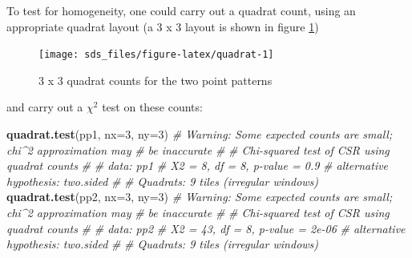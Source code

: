 \documentclass[]{book}
\newenvironment{Shaded}{\begin{snugshade}}{\end{snugshade}}
\newcommand{\CommentTok}[1]{\textcolor[rgb]{0.56,0.35,0.01}{\textit{#1}}}
\newcommand{\DataTypeTok}[1]{\textcolor[rgb]{0.13,0.29,0.53}{#1}}
\newcommand{\DecValTok}[1]{\textcolor[rgb]{0.00,0.00,0.81}{#1}}
\newcommand{\FloatTok}[1]{\textcolor[rgb]{0.00,0.00,0.81}{#1}}
\newcommand{\KeywordTok}[1]{\textcolor[rgb]{0.13,0.29,0.53}{\textbf{#1}}}
\newcommand{\NormalTok}[1]{#1}
\newcommand{\OperatorTok}[1]{\textcolor[rgb]{0.81,0.36,0.00}{\textbf{#1}}}
\newcommand{\StringTok}[1]{\textcolor[rgb]{0.31,0.60,0.02}{#1}}
\begin{document}
\begin{Shaded}
\end{Shaded}

To test for homogeneity, one could carry out a quadrat count, using
an appropriate quadrat layout (a 3 x 3 layout is shown in figure
\ref{fig:quadrat})

\begin{figure}

{\centering \texttt{[image: sds\_files/figure-latex/quadrat-1]} 

}

\caption{3 x 3 quadrat counts for the two point patterns}\label{fig:quadrat}
\end{figure}

and carry out a \(\chi^2\) test on these counts:

\begin{Shaded}
\begin{Highlighting}[]
\KeywordTok{quadrat.test}\NormalTok{(pp1, }\DataTypeTok{nx=}\DecValTok{3}\NormalTok{, }\DataTypeTok{ny=}\DecValTok{3}\NormalTok{)}
\CommentTok{# Warning: Some expected counts are small; chi^2 approximation may}
\CommentTok{# be inaccurate}
\CommentTok{# }
\CommentTok{#   Chi-squared test of CSR using quadrat counts}
\CommentTok{# }
\CommentTok{# data:  pp1}
\CommentTok{# X2 = 8, df = 8, p-value = 0.9}
\CommentTok{# alternative hypothesis: two.sided}
\CommentTok{# }
\CommentTok{# Quadrats: 9 tiles (irregular windows)}
\KeywordTok{quadrat.test}\NormalTok{(pp2, }\DataTypeTok{nx=}\DecValTok{3}\NormalTok{, }\DataTypeTok{ny=}\DecValTok{3}\NormalTok{)}
\CommentTok{# Warning: Some expected counts are small; chi^2 approximation may}
\CommentTok{# be inaccurate}
\CommentTok{# }
\CommentTok{#   Chi-squared test of CSR using quadrat counts}
\CommentTok{# }
\CommentTok{# data:  pp2}
\CommentTok{# X2 = 43, df = 8, p-value = 2e-06}
\CommentTok{# alternative hypothesis: two.sided}
\CommentTok{# }
\CommentTok{# Quadrats: 9 tiles (irregular windows)}
\end{Highlighting}
\end{Shaded}
\end{document}
